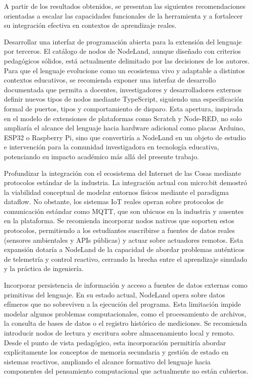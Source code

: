 
A partir de los resultados obtenidos, se presentan las siguientes recomendaciones orientadas a escalar las capacidades funcionales de la herramienta y a fortalecer su integración efectiva en contextos de aprendizaje reales.

Desarrollar una interfaz de programación abierta para la extensión del lenguaje por terceros. El catálogo de nodos de NodeLand, aunque diseñado con criterios pedagógicos sólidos, está actualmente delimitado por las decisiones de los autores. Para que el lenguaje evolucione como un ecosistema vivo y adaptable a distintos contextos educativos, se recomienda exponer una interfaz de desarrollo documentada que permita a docentes, investigadores y desarrolladores externos definir nuevos tipos de nodos mediante TypeScript, siguiendo una especificación formal de puertos, tipos y comportamiento de disparo. Esta apertura, inspirada en el modelo de extensiones de plataformas como Scratch y Node-RED, no solo ampliaría el alcance del lenguaje hacia hardware adicional como placas Arduino, ESP32 o Raspberry Pi, sino que convertiría a NodeLand en un objeto de estudio e intervención para la comunidad investigadora en tecnología educativa, potenciando su impacto académico más allá del presente trabajo.

Profundizar la integración con el ecosistema del Internet de las Cosas mediante protocolos estándar de la industria. La integración actual con micro:bit demostró la viabilidad conceptual de modelar entornos físicos mediante el paradigma dataflow. No obstante, los sistemas IoT reales operan sobre protocolos de comunicación estándar como MQTT, que son ubicuos en la industria y ausentes en la plataforma. Se recomienda incorporar nodos nativos que soporten estos protocolos, permitiendo a los estudiantes suscribirse a fuentes de datos reales (sensores ambientales y APIs públicas) y actuar sobre actuadores remotos. Esta expansión dotaría a NodeLand de la capacidad de abordar problemas auténticos de telemetría y control reactivo, cerrando la brecha entre el aprendizaje simulado y la práctica de ingeniería.

Incorporar persistencia de información y acceso a fuentes de datos externas como primitivas del lenguaje. En su estado actual, NodeLand opera sobre datos efímeros que no sobreviven a la ejecución del programa. Esta limitación impide modelar algunos problemas computacionales, como el procesamiento de archivos, la consulta de bases de datos o el registro histórico de mediciones. Se recomienda introducir nodos de lectura y escritura sobre almacenamiento local y remoto. Desde el punto de vista pedagógico, esta incorporación permitiría abordar explícitamente los conceptos de memoria secundaria y gestión de estado en sistemas reactivos, ampliando el alcance formativo del lenguaje hacia componentes del pensamiento computacional que actualmente no están cubiertos.

